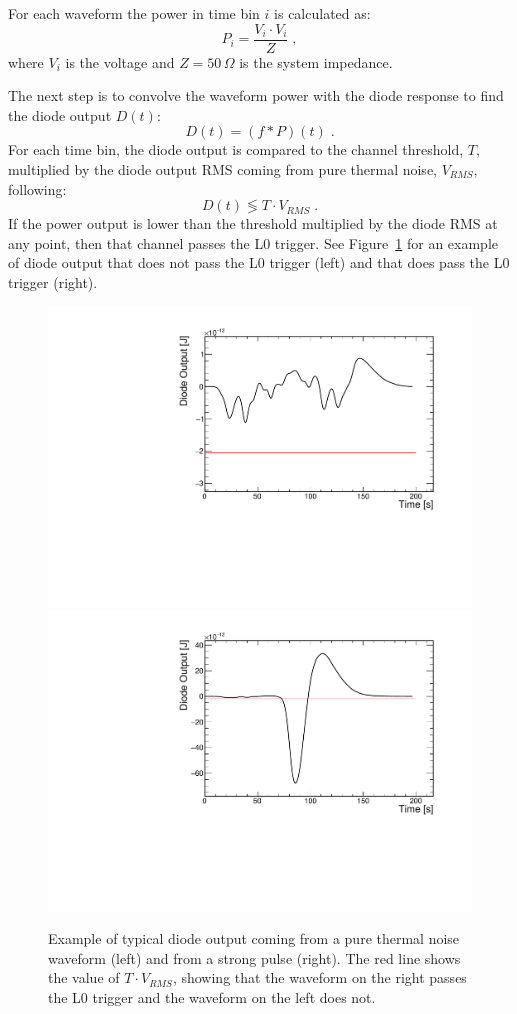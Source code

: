 For each waveform the power in time bin $i$ is calculated as:
\begin{equation}
  P_i = \dfrac{V_i \cdot V_i}{Z} \;,
\end{equation}
\noindent where $V_i$ is the voltage and $Z=50\,\Omega$ is the system impedance.

The next step is to convolve the waveform power with the diode
response to find the diode output $D(t)$:
\begin{equation}
  D(t) = (f * P)(t) \;.
\end{equation}
For each time bin, the diode output is compared to the channel
threshold, $T$, multiplied by the diode output RMS coming from pure thermal noise, $V_{RMS}$, following:
\begin{equation} 
  D(t) \lessgtr T \cdot V_{RMS} \;.
\end{equation}
If the power output is lower than the threshold multiplied by the diode RMS at any point, then that channel passes the L0 trigger.
  See Figure~\ref{fig:ANITA_diodeOutput} for an example of diode
  output that does not pass the L0 trigger (left) and that does pass
  the L0 trigger (right).

\begin{figure}[!h]\centering
  \includegraphics[width=.45\linewidth]{./Figs/newnoise_503_0_0_4_diodeOutput.pdf}
  \includegraphics[width=.45\linewidth]{./Figs/newnoise_503_0_0_0_diodeOutput.pdf}
  \caption{Example of typical diode output coming from a pure thermal
    noise waveform (left) and from a strong pulse (right). The red
    line shows the value of $T \cdot V_{RMS}$, showing that the
    waveform on the right passes the L0 trigger and the waveform on
    the left does not.}
  \label{fig:ANITA_diodeOutput}
\end{figure}

